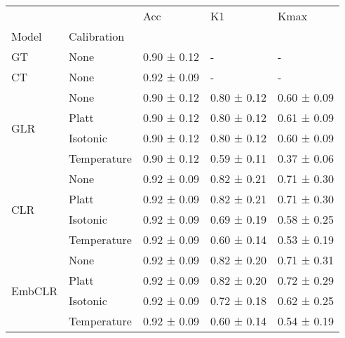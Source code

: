 \begin{tabular}{lllll}
\toprule
 &  & Acc & K1 & Kmax \\
Model & Calibration &  &  &  \\
\midrule
GT & None & 0.90 ± 0.12 & - & - \\
\cline{1-5}
CT & None & 0.92 ± 0.09 & - & - \\
\cline{1-5}
\multirow[t]{4}{*}{GLR} & None & 0.90 ± 0.12 & 0.80 ± 0.12 & 0.60 ± 0.09 \\
 & Platt & 0.90 ± 0.12 & 0.80 ± 0.12 & 0.61 ± 0.09 \\
 & Isotonic & 0.90 ± 0.12 & 0.80 ± 0.12 & 0.60 ± 0.09 \\
 & Temperature & 0.90 ± 0.12 & 0.59 ± 0.11 & 0.37 ± 0.06 \\
\cline{1-5}
\multirow[t]{4}{*}{CLR} & None & 0.92 ± 0.09 & 0.82 ± 0.21 & 0.71 ± 0.30 \\
 & Platt & 0.92 ± 0.09 & 0.82 ± 0.21 & 0.71 ± 0.30 \\
 & Isotonic & 0.92 ± 0.09 & 0.69 ± 0.19 & 0.58 ± 0.25 \\
 & Temperature & 0.92 ± 0.09 & 0.60 ± 0.14 & 0.53 ± 0.19 \\
\cline{1-5}
\multirow[t]{4}{*}{EmbCLR} & None & 0.92 ± 0.09 & 0.82 ± 0.20 & 0.71 ± 0.31 \\
 & Platt & 0.92 ± 0.09 & 0.82 ± 0.20 & 0.72 ± 0.29 \\
 & Isotonic & 0.92 ± 0.09 & 0.72 ± 0.18 & 0.62 ± 0.25 \\
 & Temperature & 0.92 ± 0.09 & 0.60 ± 0.14 & 0.54 ± 0.19 \\
\cline{1-5}
\bottomrule
\end{tabular}
